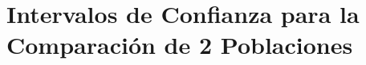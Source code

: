
\chapter[Intervalos de Confianza para la Comparación de 2 Poblaciones]{Intervalos de Confianza para la \\ Comparación de 2 Poblaciones}\label{cap:intervalos-confianza-2-poblaciones}






